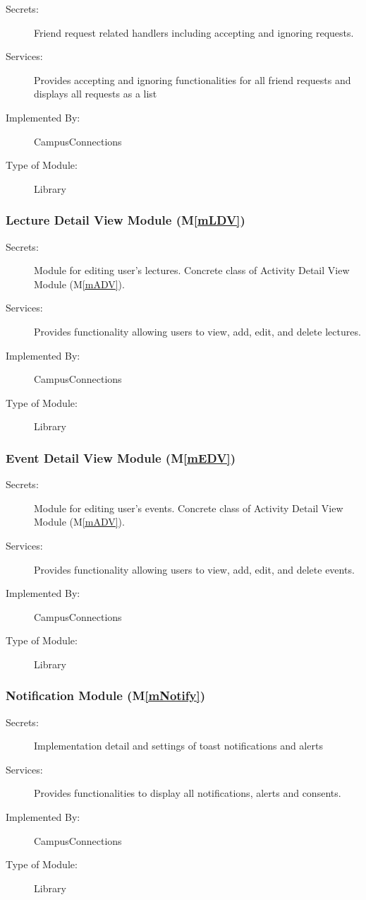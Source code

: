 \documentclass[12pt, titlepage]{article}
\newcommand{\mref}[1]{M\ref{#1}}
\begin{document}
\begin{description}
\item[Secrets:]Friend request related handlers including accepting and ignoring requests.
\item[Services:]Provides accepting and ignoring functionalities for all friend requests and displays all requests as a list
\item[Implemented By:] CampusConnections
\item[Type of Module:] Library
\end{description}

\subsubsection{Lecture Detail View Module (\mref{mLDV})}

\begin{description}
\item[Secrets:]Module for editing user's lectures. Concrete class of Activity Detail View Module (\mref{mADV}).
\item[Services:]Provides functionality allowing users to view, add, edit, and delete lectures.
\item[Implemented By:] CampusConnections
\item[Type of Module:] Library
\end{description}

\subsubsection{Event Detail View Module (\mref{mEDV})}

\begin{description}
\item[Secrets:]Module for editing user's events. Concrete class of Activity Detail View Module (\mref{mADV}).
\item[Services:]Provides functionality allowing users to view, add, edit, and delete events.
\item[Implemented By:] CampusConnections
\item[Type of Module:] Library
\end{description}

\subsubsection{Notification Module (\mref{mNotify})}

\begin{description}
\item[Secrets:]Implementation detail and settings of toast notifications and alerts
\item[Services:]Provides functionalities to display all notifications, alerts and consents.
\item[Implemented By:] CampusConnections
\item[Type of Module:] Library
\end{description}
\end{document}
